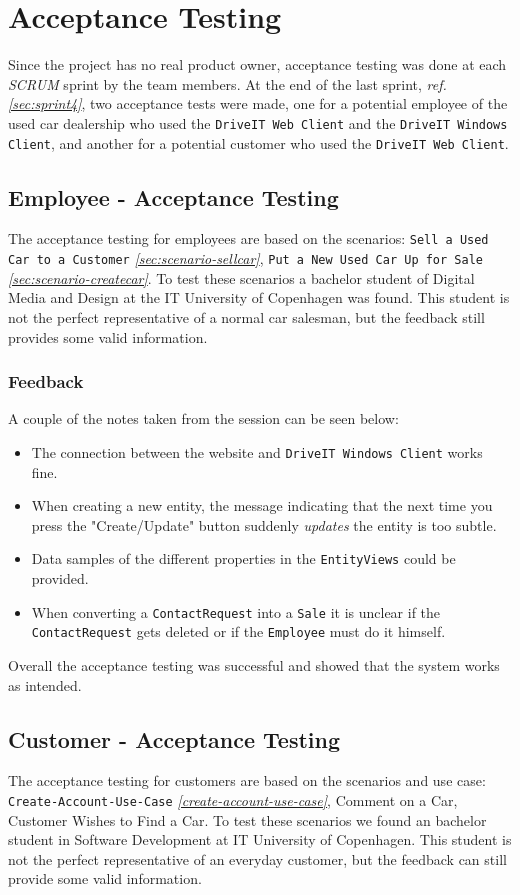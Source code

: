 \section{Acceptance Testing}
Since the project has no real product owner, acceptance testing was done at each \textit{SCRUM} sprint by the team members. At the end of the last sprint, \textit{ref. \ref{sec:sprint4}}, two acceptance tests were made, one for a potential employee of the used car dealership who used the \texttt{DriveIT Web Client} and the \texttt{DriveIT Windows Client}, and another for a potential customer who used the \texttt{DriveIT Web Client}.

\subsection{Employee - Acceptance Testing}
The acceptance testing for employees are based on the scenarios: \texttt{Sell a Used Car to a Customer} \textit{\ref{sec:scenario-sellcar}}, \texttt{Put a New Used Car Up for Sale} \textit{\ref{sec:scenario-createcar}}. To test these scenarios a bachelor student of Digital Media and Design at the IT University of Copenhagen was found. This student is not the perfect representative of a normal car salesman, but the feedback still provides some valid information.
\subsubsection{Feedback}
A couple of the notes taken from the session can be seen below:
\begin{itemize}
	\item The connection between the website and \texttt{DriveIT Windows Client} works fine.
	\item When creating a new entity, the message indicating that the next time you press the "Create/Update" button suddenly \textit{updates} the entity is too subtle.
	\item Data samples of the different properties in the \texttt{EntityViews} could be provided.
	\item When converting a \texttt{ContactRequest} into a \texttt{Sale} it is unclear if the \texttt{ContactRequest} gets deleted or if the \texttt{Employee} must do it himself.
\end{itemize}
Overall the acceptance testing was successful and showed that the system works as intended.
\subsection{Customer - Acceptance Testing}
The acceptance testing for customers are based on the scenarios and use case: \texttt{Create-Account-Use-Case} \textit{\ref{create-account-use-case}}, Comment on a Car, Customer Wishes to Find a Car. To test these scenarios we found an bachelor student in Software Development at IT University of Copenhagen. This student is not the perfect representative of an everyday customer, but the feedback can still provide some valid information.

